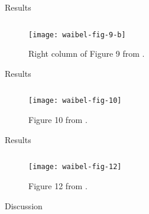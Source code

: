 \begin{frame}{Results}

\begin{figure}
\begin{columns}
\begin{column}{0.7\textwidth}
\texttt{[image: waibel-fig-9-b]}
\end{column}
\begin{column}{0.3\textwidth}
\caption{
Right column of Figure 9 from \cite{waibel2009genetic}.
}
\end{column}
\end{columns}
\end{figure}

\end{frame}

\begin{frame}{Results}


\begin{figure}
\begin{columns}
\begin{column}{0.7\textwidth}
\texttt{[image: waibel-fig-10]}
\end{column}
\begin{column}{0.3\textwidth}
\caption{
Figure 10 from \cite{waibel2009genetic}.
}
\end{column}
\end{columns}
\end{figure}

\end{frame}

\begin{frame}{Results}

\begin{figure}
\begin{columns}
\begin{column}{0.8\textwidth}
\texttt{[image: waibel-fig-12]}
\end{column}
\begin{column}{0.2\textwidth}
\caption{
Figure 12 from \cite{waibel2009genetic}.
}
\end{column}
\end{columns}
\end{figure}

\end{frame}

\begin{frame}{Discussion}

\end{frame}
